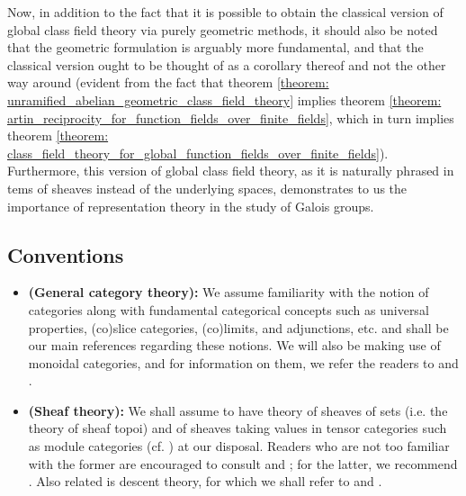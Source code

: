         Now, in addition to the fact that it is possible to obtain the classical version of global class field theory via purely geometric methods, it should also be noted that the geometric formulation is arguably more fundamental, and that the classical version ought to be thought of as a corollary thereof and not the other way around (evident from the fact that theorem \ref{theorem: unramified_abelian_geometric_class_field_theory} implies theorem \ref{theorem: artin_reciprocity_for_function_fields_over_finite_fields}, which in turn implies theorem \ref{theorem: class_field_theory_for_global_function_fields_over_finite_fields}). Furthermore, this version of global class field theory, as it is naturally phrased in tems of sheaves instead of the underlying spaces, demonstrates to us the importance of representation theory in the study of Galois groups.
        
    \subsection{Conventions}
        \begin{convention} \label{conv: category_theory}
            \noindent
            \begin{itemize}
                \item \textbf{(General category theory):} We assume familiarity with the notion of categories along with fundamental categorical concepts such as universal properties, (co)slice categories, (co)limits, and adjunctions, etc. \cite{maclane} and \cite[\href{https://stacks.math.columbia.edu/tag/0011}{Tag 0011}]{stacks} shall be our main references regarding these notions. We will also be making use of monoidal categories, and for information on them, we refer the readers to \cite[Chapter VII]{maclane} and \cite[Chapters 2 and 4]{EGNO}.
                \item \textbf{(Sheaf theory):} We shall assume to have theory of sheaves of sets (i.e. the theory of sheaf topoi) and of sheaves taking values in tensor categories such as module categories (cf. \cite[Chapter 4]{EGNO}) at our disposal. Readers who are not too familiar with the former are encouraged to consult \cite{sga4} and \cite[\href{https://stacks.math.columbia.edu/tag/00UZ}{Tag 00UZ}]{stacks}; for the latter, we recommend \cite[\href{https://stacks.math.columbia.edu/tag/006A}{Tag 006A}, \href{https://stacks.math.columbia.edu/tag/01AC}{Tag 01AC}, and \href{https://stacks.math.columbia.edu/tag/03A4}{Tag 03A4}]{stacks}. Also related is descent theory, for which we shall refer to \cite{vistoli_descent} and \cite[\href{https://stacks.math.columbia.edu/tag/0266}{Tag 0266} and \href{https://stacks.math.columbia.edu/tag/0238}{Tag 0238}]{stacks}.
            \end{itemize}
        \end{convention}
        
